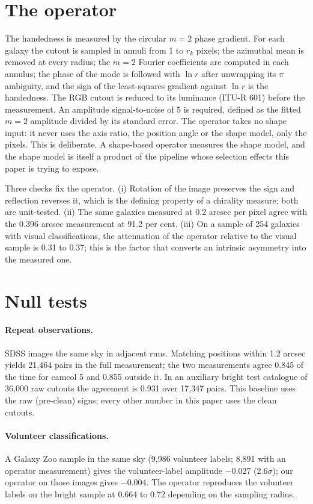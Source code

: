\documentclass[linenumbers]{aa}
\begin{document}
\section{The operator}

The handedness is measured by the circular $m=2$ phase gradient. For each galaxy the cutout is
sampled in annuli from 1 to $r_k$ pixels; the azimuthal mean is removed at every radius; the $m=2$
Fourier coefficients are computed in each annulus; the phase of the mode is followed with $\ln r$
after unwrapping its $\pi$ ambiguity, and the sign of the least-squares gradient against $\ln r$ is
the handedness. The RGB cutout is reduced to its luminance (ITU-R 601) before the measurement. An
amplitude signal-to-noise of 5 is required, defined as the fitted $m=2$ amplitude divided by its
standard error. The operator takes no shape input: it never uses the axis ratio, the position angle or
the shape model, only the pixels. This is deliberate. A shape-based operator measures the shape
model, and the shape model is itself a product of the pipeline whose selection effects this paper
is trying to expose.

Three checks fix the operator. (i) Rotation of the image preserves the sign and reflection reverses
it, which is the defining property of a chirality measure; both are unit-tested. (ii) The same
galaxies measured at 0.2 arcsec per pixel agree with the 0.396 arcsec measurement at 91.2 per cent.
(iii) On a sample of 254 galaxies with visual classifications, the attenuation of the operator
relative to the visual sample is 0.31 to 0.37; this is the factor that converts an intrinsic
asymmetry into the measured one.

\section{Null tests}

\paragraph{Repeat observations.} SDSS images the same sky in adjacent runs. Matching positions
within 1.2 arcsec yields 21,464 pairs in the full measurement; the two measurements agree 0.845 of
the time for camcol 5 and 0.855 outside it. In an auxiliary bright test catalogue of 36,000 raw cutouts the agreement is 0.931 over
17,347 pairs. This baseline uses the raw (pre-clean) signs; every other number in this paper uses
the clean cutouts.

\paragraph{Volunteer classifications.} A Galaxy Zoo sample in the same sky \citep{lintott2008, masters2021} (9,986 volunteer labels; 8,891 with an operator measurement) gives the volunteer-label amplitude $-0.027$ ($2.6\sigma$); our operator on those images gives $-0.004$. The
operator reproduces the volunteer labels on the bright sample at 0.664 to 0.72 depending on the
sampling radius.
\end{document}
